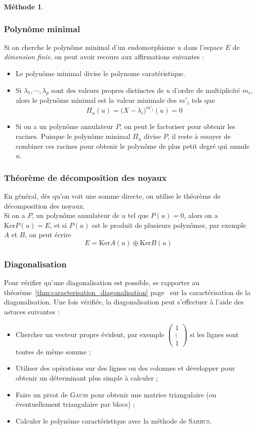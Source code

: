 \documentclass[11pt,a4paper]{report}
\theoremstyle{definition}
\newtheorem{methode}[theorem]{Méthode}
\begin{document}
\begin{methode}
     \subsubsection*{Polynôme minimal}
     Si on cherche le polynôme minimal d'un endomorphisme $u$ dans l'espace $E$ de \emph{dimension finie}, on peut avoir recours aux affirmations suivantes :
     \begin{itemize}
         \item Le polynôme minimal divise le polynome caratéristique. 
         \item Si $\lambda_1, \cdots, \lambda_p$ sont des valeurs propres distinctes de $u$ d'ordre de multiplicité $m_i$, alors le polynôme minimal est la valeur minimale des $m'_i$ tels que
         \[
             \Pi_u (u) = \bigg( X - \lambda_i \bigg)^{m'_i} (u) = 0
         \]
         \item Si on a un polynôme annulateur $P$, on peut le factoriser pour obtenir les racines. Puisque le polynôme minimal $\Pi_u$ divise $P$, il reste à essayer de combiner ces racines pour obtenir le polynôme de plus petit degré qui annule $u$. 
     \end{itemize}
     \subsubsection*{Théorème de décomposition des noyaux}
     En général, dès qu'on voit une somme directe, on utilise le théorème de décomposition des noyaux. \\
     Si on a $P$, un polynôme annulateur de $u$ tel que $P(u) = 0$, alors on a $\mathrm{Ker}P(u) = E$, et si $P(u)$ est le produit de plusieurs polynômes, par exemple $A$ et $B$, on peut écrire 
     \[
         E = \mathrm{Ker} A(u) \oplus \mathrm{Ker} B(u)
     \]
     \subsubsection*{Diagonalisation}
Pour vérifier qu'une diagonalisation est possible, se rapporter au théorème~\ref{thm:caracterisation_diagonalisation} page~\pageref{thm:caracterisation_diagonalisation} sur la caractérisation de la diagonalisation. Une fois vérifiée, la diagonalisation peut s'effectuer à l'aide des astuces suivantes : 
\begin{itemize}
    \item Chercher un vecteur propre évident, par exemple $\begin{pmatrix} 1\\ \vdots \\ 1 \end{pmatrix}$ si les lignes sont toutes de même somme ;
    \item Utiliser des opérations sur des lignes ou des colonnes et développer pour obtenir un déterminant plus simple à calculer ;
    \item Faire un pivot de \textsc{Gauss} pour obtenir une matrice triangulaire (ou éventuellement triangulaire par blocs) ;
    \item Calculer le polynôme caractéristique avec la méthode de \textsc{Sarrus}.
\end{itemize}
\end{methode}
\end{document}
